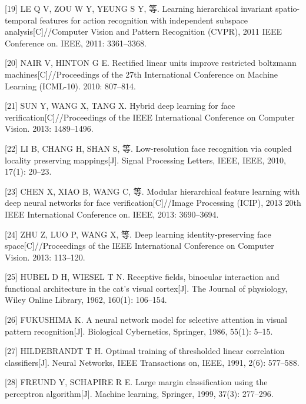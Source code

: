 \documentclass[bachelor,zhspacing]{cqu}  %
\begin{document}
\hypertarget{ref-le2011learning}{}
{[}19{]} LE Q V, ZOU W Y, YEUNG S Y, 等. Learning hierarchical invariant
spatio-temporal features for action recognition with independent
subspace analysis{[}C{]}//Computer Vision and Pattern Recognition
(CVPR), 2011 IEEE Conference on. IEEE, 2011: 3361--3368.

\hypertarget{ref-nair2010rectified}{}
{[}20{]} NAIR V, HINTON G E. Rectified linear units improve restricted
boltzmann machines{[}C{]}//Proceedings of the 27th International
Conference on Machine Learning (ICML-10). 2010: 807--814.

\hypertarget{ref-sun2013hybrid}{}
{[}21{]} SUN Y, WANG X, TANG X. Hybrid deep learning for face
verification{[}C{]}//Proceedings of the IEEE International Conference on
Computer Vision. 2013: 1489--1496.

\hypertarget{ref-li2010low}{}
{[}22{]} LI B, CHANG H, SHAN S, 等. Low-resolution face recognition via
coupled locality preserving mappings{[}J{]}. Signal Processing Letters,
IEEE, IEEE, 2010, 17(1): 20--23.

\hypertarget{ref-chen2013modular}{}
{[}23{]} CHEN X, XIAO B, WANG C, 等. Modular hierarchical feature
learning with deep neural networks for face verification{[}C{]}//Image
Processing (ICIP), 2013 20th IEEE International Conference on. IEEE,
2013: 3690--3694.

\hypertarget{ref-zhu2013deep}{}
{[}24{]} ZHU Z, LUO P, WANG X, 等. Deep learning identity-preserving
face space{[}C{]}//Proceedings of the IEEE International Conference on
Computer Vision. 2013: 113--120.

\hypertarget{ref-hubel1962receptive}{}
{[}25{]} HUBEL D H, WIESEL T N. Receptive fields, binocular interaction
and functional architecture in the cat's visual cortex{[}J{]}. The
Journal of physiology, Wiley Online Library, 1962, 160(1): 106--154.

\hypertarget{ref-fukushima1986neural}{}
{[}26{]} FUKUSHIMA K. A neural network model for selective attention in
visual pattern recognition{[}J{]}. Biological Cybernetics, Springer,
1986, 55(1): 5--15.

\hypertarget{ref-hildebrandt1991optimal}{}
{[}27{]} HILDEBRANDT T H. Optimal training of thresholded linear
correlation classifiers{[}J{]}. Neural Networks, IEEE Transactions on,
IEEE, 1991, 2(6): 577--588.

\hypertarget{ref-freund1999large}{}
{[}28{]} FREUND Y, SCHAPIRE R E. Large margin classification using the
perceptron algorithm{[}J{]}. Machine learning, Springer, 1999, 37(3):
277--296.
\end{document}
